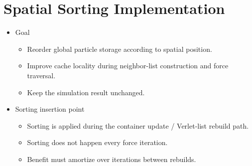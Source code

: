 \chapter{Spatial Sorting Implementation}
\label{ch:sorting_implementation}

\begin{itemize}
    \item Goal
    \begin{itemize}
        \item Reorder global particle storage according to spatial position.
        \item Improve cache locality during neighbor-list construction and force traversal.
        \item Keep the simulation result unchanged.
    \end{itemize}

    \item Sorting insertion point
    \begin{itemize}
        \item Sorting is applied during the container update / Verlet-list rebuild path.
        \item Sorting does not happen every force iteration.
        \item Benefit must amortize over iterations between rebuilds.
    \end{itemize}


\end{itemize}
